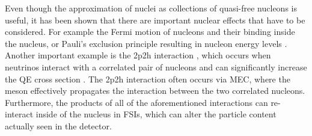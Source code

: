 




Even though the approximation of nuclei as collections of quasi-free nucleons is useful, it has been shown \cite{MiniBooNE2p2hExperimentalDiscrepancy2010.pdf} that there are important nuclear effects that have to be considered. For example the Fermi motion of nucleons and their binding inside the nucleus, or Pauli's exclusion principle resulting in nucleon energy levels \cite{NeutrinoIntOverview2022.pdf}. Another important example is the \gls{2p2h} interaction \cite{FirstUseOfMEC2009.pdf, FirstUseOfMEC2010.pdf, FirstUseOfMEC2011.pdf}, which occurs when neutrinos interact with a correlated pair of nucleons and can significantly increase the \gls{QE} cross section \cite{NeutrinoIntOverview2022.pdf}. The \gls{2p2h} interaction often occurs via \gls{MEC}, where the meson effectively propagates the interaction between the two correlated nucleons. Furthermore, the products of all of the aforementioned interactions can re-interact inside of the nucleus in \glspl{FSI}, which can alter the particle content actually seen in the detector.

